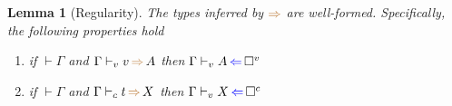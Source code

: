 \documentclass[a4,natbib=false]{article}
\newtheorem{lemma}{Lemma}
\newcommand{\unival}{\square^{v}}
\newcommand{\unicomp}{\square^{c}}
\newcommand{\judgectx}[2]{{#1} \vdash {#2}}
\newcommand{\checks}{{\color{blue} \Leftarrow}}
\newcommand{\infers}{{\color{brown} \Rightarrow}}
\newcommand{\judgecInfer}[3]{{#1} \vdash_{c} {#2} \, \infers \, {#3}}
\newcommand{\judgevCheck}[3]{{#1} \vdash_{v} {#2} \, \checks \, {#3}}
\newcommand{\judgevInfer}[3]{{#1} \vdash_{v} {#2} \, \infers \, {#3}}
\begin{document}
\begin{lemma}[Regularity]
  The types inferred by $\infers$ are well-formed. Specifically, the following properties hold
  \begin{enumerate}
  \item if $\judgectx{}{\Gamma}$ and $\judgevInfer{\Gamma}{v}{A}$ then $\judgevCheck{\Gamma}{A}{\unival}$
  \item if $\judgectx{}{\Gamma}$ and $\judgecInfer{\Gamma}{t}{X}$ then $\judgevCheck{\Gamma}{X}{\unicomp}$
  \end{enumerate}
\end{lemma}

\printbibliography
\end{document}
